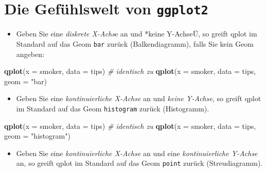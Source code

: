 \documentclass[12pt,ngerman,]{book}
\newenvironment{Shaded}{\begin{snugshade}}{\end{snugshade}}
\newcommand{\KeywordTok}[1]{\textcolor[rgb]{0.13,0.29,0.53}{\textbf{{#1}}}}
\newcommand{\DataTypeTok}[1]{\textcolor[rgb]{0.13,0.29,0.53}{{#1}}}
\newcommand{\StringTok}[1]{\textcolor[rgb]{0.31,0.60,0.02}{{#1}}}
\newcommand{\CommentTok}[1]{\textcolor[rgb]{0.56,0.35,0.01}{\textit{{#1}}}}
\newcommand{\NormalTok}[1]{{#1}}
\providecommand{\tightlist}{%
  \setlength{\itemsep}{0pt}\setlength{\parskip}{0pt}}
\renewenvironment{Shaded}{\begin{kframe}}{\end{kframe}}
\begin{document}
\section{\texorpdfstring{Die Gefühlswelt von
\texttt{ggplot2}}{Die Gefühlswelt von ggplot2}}\label{die-gefuhlswelt-von-ggplot2}

\begin{itemize}
\tightlist
\item
  Geben Sie eine \emph{diskrete X-Achs}e an und *keine Y-AchseÜ, so
  greift qplot im Standard auf das Geom \texttt{bar} zurück
  (Balkendiagramm), falls Sie kein Geom angeben:
\end{itemize}

\begin{Shaded}
\begin{Highlighting}[]
\KeywordTok{qplot}\NormalTok{(}\DataTypeTok{x =} \NormalTok{smoker, }\DataTypeTok{data =} \NormalTok{tips)  }\CommentTok{# identisch zu}
\KeywordTok{qplot}\NormalTok{(}\DataTypeTok{x =} \NormalTok{smoker, }\DataTypeTok{data =} \NormalTok{tips, }\DataTypeTok{geom =} \StringTok{"bar)}
\end{Highlighting}
\end{Shaded}

\begin{itemize}
\tightlist
\item
  Geben Sie eine \emph{kontinuierliche X-Achse} an und \emph{keine
  Y-Achse}, so greift qplot im Standard auf das Geom \texttt{histogram}
  zurück (Histogramm).
\end{itemize}

\begin{Shaded}
\begin{Highlighting}[]
\KeywordTok{qplot}\NormalTok{(}\DataTypeTok{x =} \NormalTok{smoker, }\DataTypeTok{data =} \NormalTok{tips)  }\CommentTok{# identisch zu}
\KeywordTok{qplot}\NormalTok{(}\DataTypeTok{x =} \NormalTok{smoker, }\DataTypeTok{data =} \NormalTok{tips, }\DataTypeTok{geom =} \StringTok{"histogram"}\NormalTok{)}
\end{Highlighting}
\end{Shaded}

\begin{itemize}
\tightlist
\item
  Geben Sie eine \emph{kontinuierliche X-Achse} an und eine
  \emph{kontinuierliche Y-Achse} an, so greift qplot im Standard auf das
  Geom \texttt{point} zurück (Streudiagramm).
\end{itemize}
\end{document}

